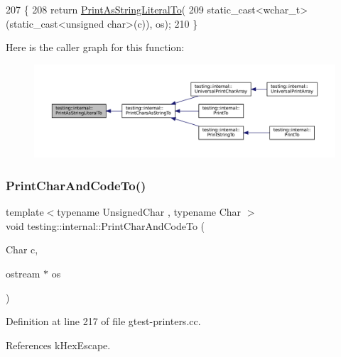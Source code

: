 \begin{DoxyCode}
207                                                               \{
208   \textcolor{keywordflow}{return} \hyperlink{namespacetesting_1_1internal_a82e5b3cf45fd9c4603dbe14bc4cb38c2}{PrintAsStringLiteralTo}(
209       static\_cast<wchar\_t>(static\_cast<unsigned char>(c)), os);
210 \}
\end{DoxyCode}
Here is the caller graph for this function\+:
\nopagebreak
\begin{figure}[H]
\begin{center}
\leavevmode
\includegraphics[width=350pt]{namespacetesting_1_1internal_a82e5b3cf45fd9c4603dbe14bc4cb38c2_icgraph}
\end{center}
\end{figure}
\mbox{\label{namespacetesting_1_1internal_a0c577e598e61d339ba45dd6643fb1969}} 
\subsubsection{\texorpdfstring{Print\+Char\+And\+Code\+To()}{PrintCharAndCodeTo()}}
{\footnotesize\ttfamily template$<$typename Unsigned\+Char , typename Char $>$ \\
void testing\+::internal\+::\+Print\+Char\+And\+Code\+To (\begin{DoxyParamCaption}\item[{Char}]{c,  }\item[{ostream $\ast$}]{os }\end{DoxyParamCaption})}



Definition at line 217 of file gtest-\/printers.\+cc.



References k\+Hex\+Escape.


